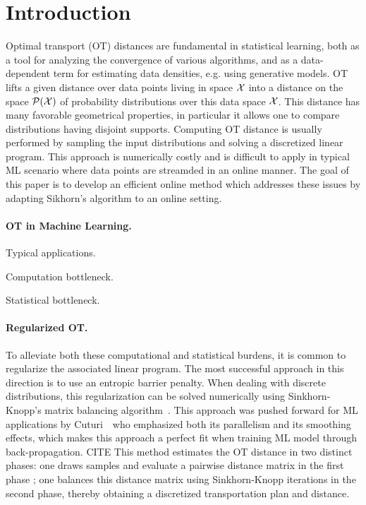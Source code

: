 \section{Introduction}

Optimal transport (OT) distances are fundamental in statistical learning, both as a tool for analyzing the convergence of various algorithms, and as a data-dependent term for estimating data densities, e.g. using generative models.
%
OT lifts a given distance over data points living in space $\mathcal{X}$ into a distance
on the space $\mathcal{P}(\mathcal{X})$ of probability distributions over this data space $\mathcal{X}$.
%
This distance has many favorable geometrical properties, in particular it allows one to compare distributions having disjoint supports. 
% 
Computing OT distance is usually performed by sampling the input distributions and solving a discretized linear program. This approach is numerically costly and is difficult to apply in typical ML scenario where data points are streamded in an online manner.   
%
The goal of this paper is to develop an efficient online method which addresses these issues by adapting Sikhorn's algorithm to an online setting.
  
\paragraph{OT in Machine Learning.}

Typical applications.

Computation bottleneck.

Statistical bottleneck.


\paragraph{Regularized OT.}

To alleviate both these computational and statistical burdens, it is common to regularize the associated linear program.
%
The most successful approach in this direction is to use an entropic barrier penalty. 
%
When dealing with discrete distributions, this regularization can be solved numerically using Sinkhorn-Knopp's matrix balancing algorithm~\cite{}.
%
This approach was pushed forward for ML applications by Cuturi~\cite{} who emphasized both its parallelism and its smoothing effects, which makes this approach a perfect fit when training ML model through back-propagation. CITE
%
This method estimates the OT distance in two distinct phases: one draws samples and evaluate a pairwise distance matrix in the first phase ; one balances this distance matrix using Sinkhorn-Knopp iterations in the second phase, thereby obtaining a discretized 
transportation plan and distance.

